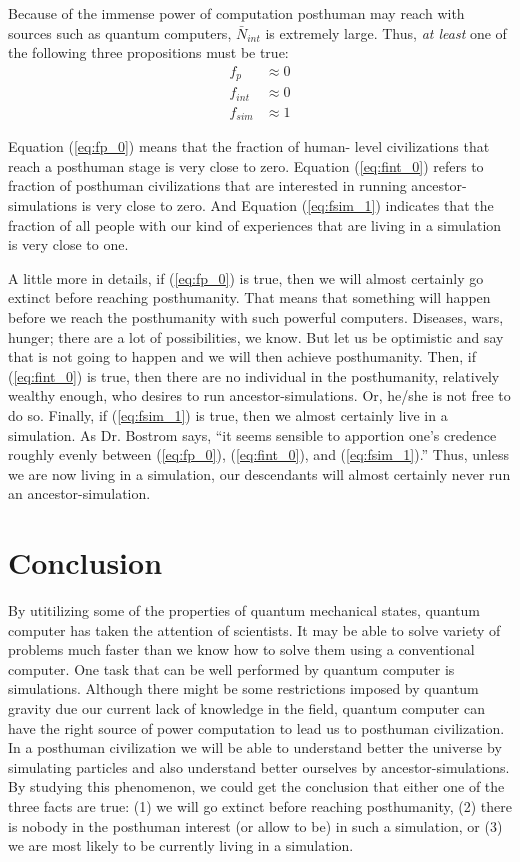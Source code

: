 \documentclass[twoside,11pt]{article}
\begin{document}
Because of the immense power of computation posthuman may reach with sources such as quantum computers, $\bar{N}_{int}$ is extremely large.
Thus, \emph{at least} one of the following three propositions must be true:
\begin{align}
	f_p &\approx  0 \label{eq:fp_0} \\
	f_{int} &\approx  0 \label{eq:fint_0} \\
	f_{sim} &\approx  1 \label{eq:fsim_1}
\end{align}



Equation (\ref{eq:fp_0}) means that the fraction of human- level civilizations that reach a posthuman stage is very close to zero.
Equation (\ref{eq:fint_0}) refers to fraction of posthuman civilizations that are interested in running ancestor-simulations is very close to zero.
And Equation (\ref{eq:fsim_1}) indicates that the fraction of all people with our kind of experiences that are living in a simulation is very close to one.

A little more in details, if (\ref{eq:fp_0}) is true, then we will almost certainly go extinct before reaching posthumanity.
That means that something will happen before we reach the posthumanity with such powerful computers.
Diseases, wars, hunger; there are a lot of possibilities, we know.
But let us be optimistic and say that is not going to happen and we will then achieve posthumanity.
Then, if (\ref{eq:fint_0}) is true, then there are no individual in the posthumanity, relatively wealthy enough, who desires to run ancestor-simulations.
Or, he/she is not free to do so.
Finally, if (\ref{eq:fsim_1}) is true, then we almost certainly live in a simulation. 
As Dr. Bostrom says, ``it seems sensible to apportion one’s credence roughly evenly between (\ref{eq:fp_0}), (\ref{eq:fint_0}), and (\ref{eq:fsim_1}).''
Thus, unless we are now living in a simulation, our descendants will almost certainly never run an ancestor-simulation.

\section{Conclusion}
\label{sec:conc}

By utitilizing some of the properties of quantum mechanical states, quantum computer has taken the attention of scientists.
It may be able to solve variety of problems much faster than we know how to solve them using a conventional computer.
One task that can be well performed by quantum computer is simulations.
Although there might be some restrictions imposed by quantum gravity due our current lack of knowledge in the field, quantum computer can have the right source of power computation to lead us to posthuman civilization.
In a posthuman civilization we will be able to understand better the universe by simulating particles and also understand better ourselves by ancestor-simulations.
By studying this phenomenon, we could get the conclusion that either one of the three facts are true: (1) we will go extinct before reaching posthumanity, (2) there is nobody in the posthuman interest (or allow to be) in such a simulation, or (3) we are most likely to be currently living in a simulation.

\vskip 0.2in

\end{document}
